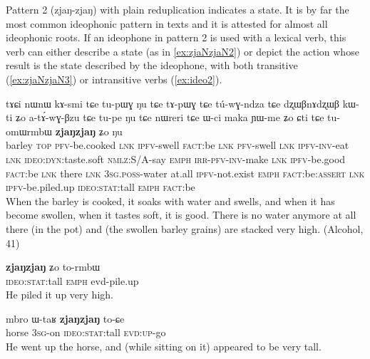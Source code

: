 \documentclass[oldfontcommands,oneside,a4paper,11pt]{article}
\newcommand{\ipa}[1]{{\phon \mbox{#1}}} %
\begin{document}
Pattern 2 (\ipa{zjaŋ-zjaŋ}) with plain reduplication  indicates a state. It is by far the most common ideophonic pattern in texts and it is attested for almost all ideophonic roots.  If an ideophone in pattern 2 is used with a lexical verb, this verb can either describe a state (as in \ref{ex:zjaNzjaN2}) or depict the action whose result is the state described by the ideophone, with both transitive (\ref{ex:zjaNzjaN3}) or intransitive verbs (\ref{ex:ideo2}).

 
 
  \begin{exe} 
\ex  \label{ex:zjaNzjaN2}
\gll 
 \ipa{tɤɕi}  	\ipa{nɯnɯ}  	\ipa{kɤ-smi}  	\ipa{tɕe}  	\ipa{tu-pɯɣ}  	\ipa{ŋu}  	\ipa{tɕe}  	\ipa{tɤ-pɯɣ}  	\ipa{tɕe}  	\ipa{tú-wɣ-ndza}  	\ipa{tɕe}  	\ipa{dʐɯβnɤdʐɯβ}  	\ipa{kɯ-ti}  	\ipa{ʑo}  	\ipa{a-tɤ́-wɣ-βzu}  	\ipa{tɕe}  	\ipa{tu-pe}  	\ipa{ŋu}  	\ipa{tɕe}  	\ipa{nɯreri}  	\ipa{tɕe}  	\ipa{ɯ-ci}  	\ipa{maka}  	\ipa{ɲɯ-me}  	\ipa{ʑo}  	\ipa{ɕti}  	\ipa{tɕe}  	\ipa{tu-omɯrmbɯ}  	\ipa{\textbf{zjaŋzjaŋ}}  	\ipa{ʑo}  	\ipa{ŋu}  \\
 barley \textsc{top} \textsc{pfv}-be.cooked \textsc{lnk} \textsc{ipfv}-swell \textsc{fact}:be \textsc{lnk} \textsc{pfv}-swell \textsc{lnk} \textsc{ipfv-inv}-eat \textsc{lnk} \textsc{ideo:dyn}:taste.soft \textsc{nmlz}:S/A-say \textsc{emph} \textsc{irr-pfv-inv}-make \textsc{lnk} \textsc{ipfv}-be.good \textsc{fact}:be \textsc{lnk} there \textsc{lnk} \textsc{3sg.poss}-water at.all \textsc{ipfv}-not.exist  \textsc{emph} \textsc{fact}:be:\textsc{assert} \textsc{lnk} \textsc{ipfv}-be.piled.up \textsc{ideo:stat}:tall \textsc{emph} \textsc{fact}:be  \\
 \glt When the barley is cooked, it soaks with water and swells, and when it has become swollen, when it tastes soft, it is good. There is no water anymore at all there (in the pot) and (the swollen barley grains) are stacked very high.  (Alcohol, 41)
 \end{exe}
 
  \begin{exe} 
\ex  \label{ex:zjaNzjaN3}
\gll 
\ipa{\textbf{zjaŋzjaŋ}}  \ipa{ʑo} \ipa{to-rmbɯ} \\
 \textsc{ideo:stat}:tall \textsc{emph} evd-pile.up \\
 \glt He piled it up very high.
  \end{exe}
 \begin{exe} 
\ex  \label{ex:ideo2}
\gll 
\ipa{mbro}  	\ipa{ɯ-taʁ}  	\ipa{\textbf{zjaŋzjaŋ}}  	\ipa{to-ɕe}  \\
horse \textsc{3sg}-on \textsc{ideo:stat}:tall  \textsc{evd:up}-go \\
\glt He went up the horse, and (while sitting on it) appeared to be very tall.  
 \end{exe}
 
\end{document}
